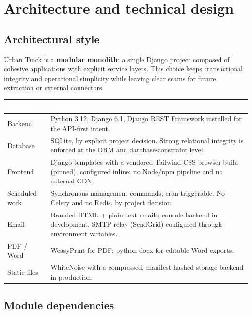 \documentclass[11pt,a4paper]{article}
\renewcommand{\arraystretch}{1.25}
\newcommand{\theadcell}[1]{\textcolor{white}{\textbf{#1}}}
\newcommand{\tablehead}[1]{\rowcolor{mil900}#1}
\newcommand{\tablealt}{\rowcolor{mil50}}
\begin{document}
\section{Architecture and technical design}
\label{sec:architecture}

\subsection{Architectural style}

Urban Track is a \textbf{modular monolith}: a single Django project composed of
cohesive applications with explicit service layers. This choice keeps
transactional integrity and operational simplicity while leaving clear seams
for future extraction or external connectors.

\begin{center}
\renewcommand{\arraystretch}{1.3}
\begin{tabularx}{\textwidth}{@{}L{3.3cm}Y@{}}
  \toprule
  \tablehead{\theadcell{Concern} & \theadcell{Decision}} \\
  \midrule
  Backend & Python 3.12, Django 6.1, Django REST Framework installed for the
  API-first intent. \\
  \tablealt
  Database & SQLite, by explicit project decision. Strong relational integrity
  is enforced at the ORM and database-constraint level. \\
  Frontend & Django templates with a vendored Tailwind CSS browser build
  (pinned), configured inline; no Node/npm pipeline and no external CDN. \\
  \tablealt
  Scheduled work & Synchronous management commands, cron-triggerable. No Celery
  and no Redis, by project decision. \\
  Email & Branded HTML + plain-text emails; console backend in development,
  SMTP relay (SendGrid) configured through environment variables. \\
  \tablealt
  PDF / Word & WeasyPrint for PDF; python-docx for editable Word exports. \\
  Static files & WhiteNoise with a compressed, manifest-hashed storage backend
  in production. \\
  \bottomrule
\end{tabularx}
\end{center}

\subsection{Module dependencies}
\end{document}
